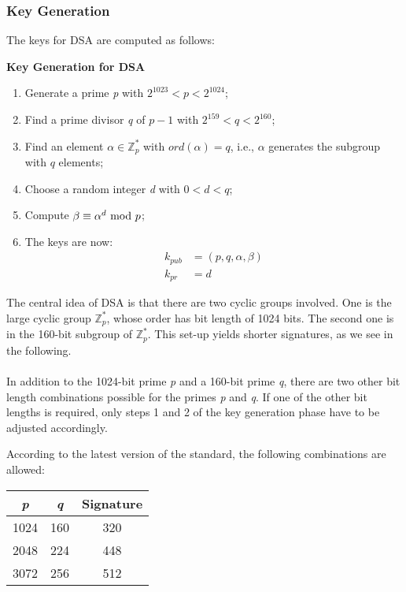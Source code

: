 \subsubsection*{Key Generation}
The keys for DSA are computed as follows:
\begin{framed}
    \hfill\break\textbf{Key Generation for DSA}
    \begin{enumerate}
        \item Generate a prime \textit{p} with $2^{1023}<p<2^{1024}$;
        \item Find a prime divisor \textit{q} of $p-1$ with $2^{159}<q<2^{160}$;
        \item Find an element $\alpha\in\mathbb{Z}^*_p$ with $ord(\alpha)=q$, i.e., $\alpha$ generates the subgroup with $q$ elements;
        \item Choose a random integer \textit{d} with $0<d<q$;
        \item Compute $\beta\equiv\alpha^d\text{ mod } p$;
        \item The keys are now:
        \begin{align*}
            k_{pub}&=(p,q,\alpha,\beta)\\
            k_{pr}&=d
        \end{align*}
    \end{enumerate}
\end{framed}
The central idea of DSA is that there are two cyclic groups involved. One is the large cyclic group $\mathbb{Z}_p^*$, whose order has bit length of 1024 bits. The second one is in the 160-bit subgroup of $\mathbb{Z}_p^*$. This set-up yields shorter signatures, as we see in the following.\\\\
In addition to the 1024-bit prime \textit{p} and a 160-bit prime \textit{q}, there are two other bit length combinations possible for the primes \textit{p} and \textit{q}. If one of the other bit lengths is required, only steps 1 and 2 of the key generation phase have to be adjusted accordingly.

\newpage
\hfill\break
According to the latest version of the standard, the following combinations are allowed:
\begin{center}
    \begin{tabular}{|c|c|c|}
        \hline
        \textit{p}&\textit{q}&Signature\\
        \hline
        1024&160&320\\
        2048&224&448\\
        3072&256&512\\
        \hline
    \end{tabular}
\end{center}

